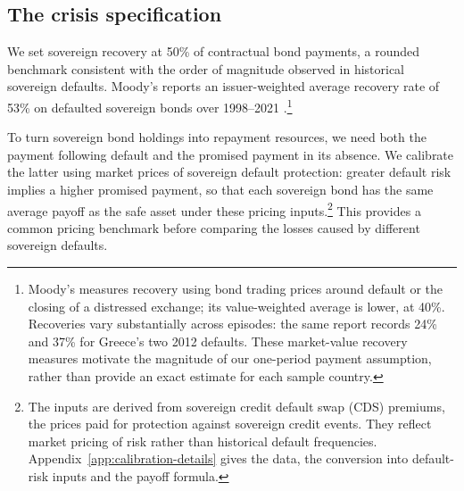 \begin{table}[htbp]
\centering
{}
\label{tab:bank-exposures}
\small

\end{table}

\subsection{The crisis specification}\label{subsec:calibration_choices}

We set sovereign recovery at 50\% of contractual bond payments, a rounded benchmark consistent with the order of magnitude observed in historical sovereign defaults. Moody's reports an issuer-weighted average recovery rate of 53\% on defaulted sovereign bonds over 1998--2021 \citep{MoodysSovereign2022}.\footnote{Moody's measures recovery using bond trading prices around default or the closing of a distressed exchange; its value-weighted average is lower, at 40\%. Recoveries vary substantially across episodes: the same report records 24\% and 37\% for Greece's two 2012 defaults. These market-value recovery measures motivate the magnitude of our one-period payment assumption, rather than provide an exact estimate for each sample country.}

To turn sovereign bond holdings into repayment resources, we need both the payment following default and the promised payment in its absence. We calibrate the latter using market prices of sovereign default protection: greater default risk implies a higher promised payment, so that each sovereign bond has the same average payoff as the safe asset under these pricing inputs.\footnote{The inputs are derived from sovereign credit default swap (CDS) premiums, the prices paid for protection against sovereign credit events. They reflect market pricing of risk rather than historical default frequencies. Appendix~\ref{app:calibration-details} gives the data, the conversion into default-risk inputs and the payoff formula.} This provides a common pricing benchmark before comparing the losses caused by different sovereign defaults.

